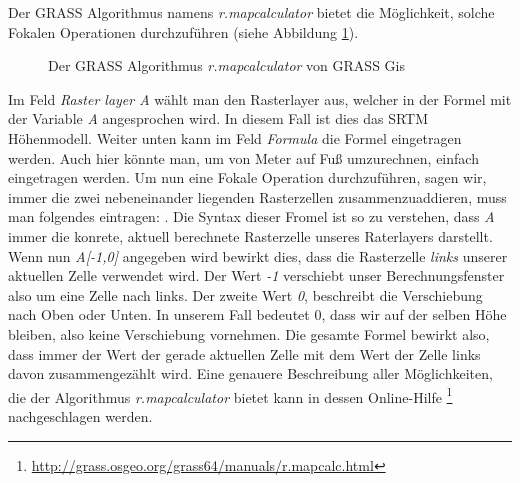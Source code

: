 \documentclass[a4paper,12pt,ngerman]{sphinxmanual}
\begin{document}
Der GRASS Algorithmus namens \emph{r.mapcalculator} bietet die Möglichkeit, solche Fokalen Operationen durchzuführen (siehe Abbildung \hyperref[uebung3:figqgisgrassrastercalc]{ \ref*{uebung3:figqgisgrassrastercalc}}).
\begin{figure}[htbp]
\centering
\capstart

\caption{Der GRASS Algorithmus \emph{r.mapcalculator} von GRASS Gis}\label{uebung3:figqgisgrassrastercalc}\end{figure}

Im Feld \emph{Raster layer A} wählt man den Rasterlayer aus, welcher in der Formel mit der Variable \emph{A} angesprochen wird. In diesem Fall ist dies das SRTM Höhenmodell.
Weiter unten kann im Feld \emph{Formula} die Formel eingetragen werden. Auch hier könnte man, um von Meter auf Fuß umzurechnen, einfach  eingetragen werden.
Um nun eine Fokale Operation durchzuführen, sagen wir, immer die zwei nebeneinander liegenden Rasterzellen zusammenzuaddieren, muss man folgendes eintragen: .
Die Syntax dieser Fromel ist so zu verstehen, dass \emph{A} immer die konrete, aktuell berechnete Rasterzelle unseres Raterlayers darstellt. Wenn nun \emph{A{[}-1,0{]}} angegeben wird bewirkt dies, dass die Rasterzelle \emph{links} unserer aktuellen Zelle verwendet wird. Der Wert \emph{-1} verschiebt unser Berechnungsfenster also um eine Zelle nach links. Der zweite Wert \emph{0}, beschreibt die Verschiebung nach Oben oder Unten. In unserem Fall bedeutet 0, dass wir auf der selben Höhe bleiben, also keine Verschiebung vornehmen.
Die gesamte Formel bewirkt also, dass immer der Wert der gerade aktuellen Zelle mit dem Wert der Zelle links davon zusammengezählt wird. Eine genauere Beschreibung aller Möglichkeiten, die der Algorithmus \emph{r.mapcalculator} bietet kann in dessen Online-Hilfe \footnote{
\href{http://grass.osgeo.org/grass64/manuals/r.mapcalc.html}{http://grass.osgeo.org/grass64/manuals/r.mapcalc.html}
} nachgeschlagen werden.
\end{document}
